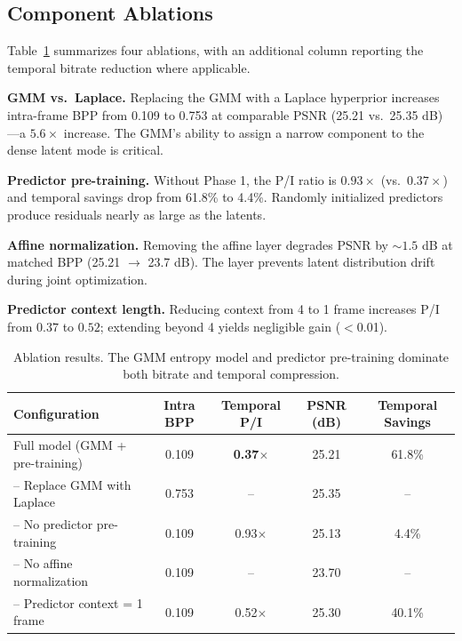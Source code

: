 \documentclass{article}
\begin{document}
\subsection{Component Ablations}
\label{sec:ablation}

Table~\ref{tab:ablation} summarizes four ablations, with an additional column reporting the temporal bitrate reduction where applicable.

\textbf{GMM vs.\ Laplace.} Replacing the GMM with a Laplace hyperprior increases intra-frame BPP from 0.109 to 0.753 at comparable PSNR (25.21 vs.\ 25.35 dB)---a $5.6{\times}$ increase. The GMM's ability to assign a narrow component to the dense latent mode is critical.

\textbf{Predictor pre-training.} Without Phase 1, the P/I ratio is $0.93{\times}$ (vs.\ $0.37{\times}$) and temporal savings drop from 61.8\% to 4.4\%. Randomly initialized predictors produce residuals nearly as large as the latents.

\textbf{Affine normalization.} Removing the affine layer degrades PSNR by ${\sim}1.5$ dB at matched BPP (25.21 $\rightarrow$ 23.7 dB). The layer prevents latent distribution drift during joint optimization.

\textbf{Predictor context length.} Reducing context from 4 to 1 frame increases P/I from $0.37$ to $0.52$; extending beyond 4 yields negligible gain ($<$0.01).

\begin{table}[ht]
\centering
\caption{Ablation results. The GMM entropy model and predictor pre-training dominate both bitrate and temporal compression.}
\label{tab:ablation}
\vspace{4pt}
\begin{tabular}{lcccc}
\toprule
Configuration & Intra BPP & Temporal P/I & PSNR (dB) & Temporal Savings \\
\midrule
Full model (GMM + pre-training) & 0.109 & \textbf{0.37}$\times$ & 25.21 & 61.8\% \\
-- Replace GMM with Laplace   & 0.753 & --              & 25.35 & -- \\
-- No predictor pre-training   & 0.109 & 0.93$\times$    & 25.13 & 4.4\% \\
-- No affine normalization     & 0.109 & --              & 23.70 & -- \\
-- Predictor context = 1 frame & 0.109 & 0.52$\times$    & 25.30 & 40.1\% \\
\bottomrule
\end{tabular}
\end{table}
\end{document}
